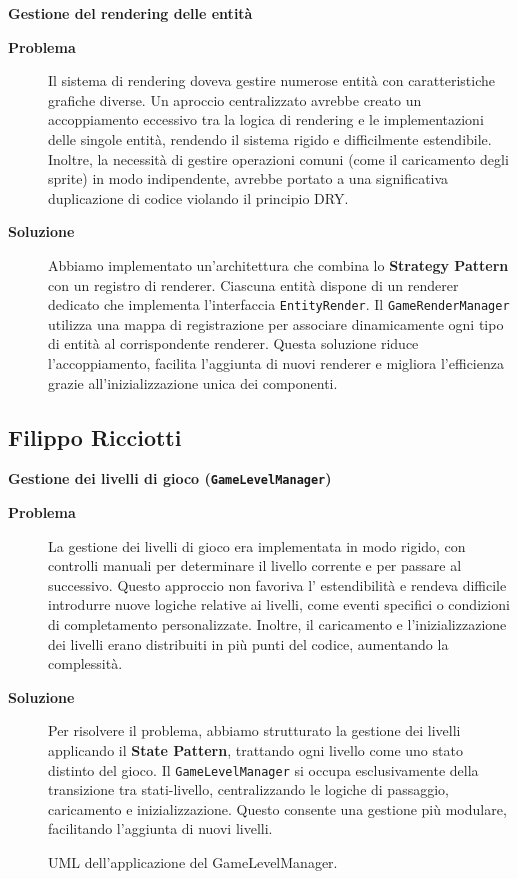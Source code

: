 \documentclass[a4paper,12pt]{report}
\begin{document}
\noindent
\textbf{Gestione del rendering delle entità}
\begin{description}
	\item[\textbf{Problema}]
	      Il sistema di rendering doveva gestire numerose entità con caratteristiche grafiche diverse. Un aproccio centralizzato avrebbe creato un accoppiamento eccessivo
	      tra la logica di rendering e le implementazioni delle singole entità, rendendo il sistema rigido e difficilmente estendibile.
	      Inoltre, la necessità di gestire operazioni comuni (come il caricamento degli sprite) in modo indipendente, avrebbe portato a una significativa duplicazione di codice
	      violando il principio DRY.

	\item[\textbf{Soluzione}]
	      Abbiamo implementato un'architettura che combina lo \textbf{Strategy Pattern} con un registro di renderer. Ciascuna entità dispone di un renderer dedicato che implementa l'interfaccia \texttt{EntityRender}.
	      Il \texttt{GameRenderManager} utilizza una mappa di registrazione per associare dinamicamente ogni tipo di entità al corrispondente renderer. Questa soluzione riduce l'accoppiamento, facilita l'aggiunta di
	      nuovi renderer e migliora l'efficienza grazie all'inizializzazione unica dei componenti.
\end{description}

\newpage
\subsection{Filippo Ricciotti}

\noindent
\textbf{Gestione dei livelli di gioco (\texttt{GameLevelManager})}
\begin{description}
	\item[\textbf{Problema}]
	      La gestione dei livelli di gioco era implementata in modo rigido, con controlli manuali per determinare il livello corrente e per passare al successivo. Questo approccio non favoriva l'
	      estendibilità e rendeva difficile introdurre nuove logiche relative ai livelli, come eventi specifici o condizioni di completamento personalizzate. Inoltre, il caricamento e l'inizializzazione dei
	      livelli erano distribuiti in più punti del codice, aumentando la complessità.

	\item[\textbf{Soluzione}]
	      Per risolvere il problema, abbiamo strutturato la gestione dei livelli applicando il \textbf{State Pattern}, trattando ogni livello come uno stato distinto del gioco. Il \texttt{GameLevelManager}
	      si occupa esclusivamente della transizione tra stati-livello, centralizzando le logiche di passaggio, caricamento e inizializzazione. Questo consente una gestione più modulare, facilitando
	      l'aggiunta di nuovi livelli.
\end{description}
\begin{figure}[H]
	\centering{}
	
	\caption{UML dell'applicazione del GameLevelManager.}
	\label{img:GameLevelManager}
\end{figure}
\end{document}

